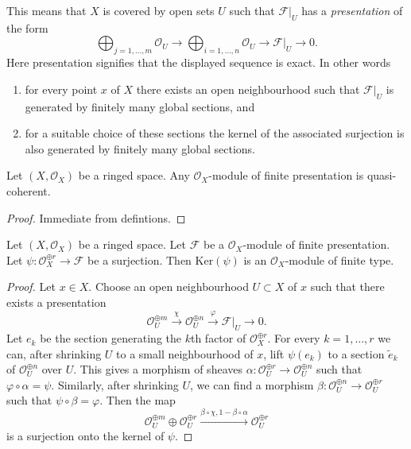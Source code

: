 \noindent
This means that $X$ is covered by open sets $U$
such that $\mathcal{F}|_U$ has a {\it presentation}
of the form
$$
\bigoplus\nolimits_{j = 1, \ldots, m}
\mathcal{O}_U
\longrightarrow
\bigoplus\nolimits_{i = 1, \ldots, n}
\mathcal{O}_U
\to
\mathcal{F}|_U
\to
0.
$$
Here presentation signifies that the displayed
sequence is exact. In other words
\begin{enumerate}
\item for every point $x$ of $X$ there exists
an open neighbourhood such that $\mathcal{F}|_U$
is generated by finitely many global sections, and
\item for a suitable choice of these sections
the kernel of the associated surjection is also
generated by finitely many global sections.
\end{enumerate}

\begin{lemma}
\label{lemma-finite-presentation-quasi-coherent}
Let $(X, \mathcal{O}_X)$ be a ringed space.
Any $\mathcal{O}_X$-module of finite presentation
is quasi-coherent.
\end{lemma}

\begin{proof}
Immediate from defintions.
\end{proof}

\begin{lemma}
\label{lemma-kernel-surjection-finite-free-onto-finite-presentation}
Let $(X, \mathcal{O}_X)$ be a ringed space.
Let $\mathcal{F}$ be a $\mathcal{O}_X$-module of finite presentation.
Let $\psi : \mathcal{O}_X^{\oplus r} \to \mathcal{F}$ be a surjection.
Then $\text{Ker}(\psi)$ is an $\mathcal{O}_X$-module of finite type.
\end{lemma}

\begin{proof}
Let $x \in X$. Choose an open neighbourhood $U \subset X$ of $x$
such that there exists a presentation
$$
\mathcal{O}_U^{\oplus m}
\xrightarrow{\chi}
\mathcal{O}_U^{\oplus n}
\xrightarrow{\varphi}
\mathcal{F}|_U
\to
0.
$$
Let $e_k$ be the section generating the $k$th factor of
$\mathcal{O}_X^{\oplus r}$. For every $k = 1, \ldots, r$
we can, after shrinking $U$ to a small neighbourhood of $x$,
lift $\psi(e_k)$ to a section $\tilde e_k$ of
$\mathcal{O}_U^{\oplus n}$ over $U$. This gives a morphism
of sheaves $\alpha : \mathcal{O}_U^{\oplus r} \to \mathcal{O}_U^{\oplus n}$
such that $\varphi \circ \alpha = \psi$.
Similarly, after shrinking $U$, we can find a morphism
$\beta : \mathcal{O}_U^{\oplus n} \to \mathcal{O}_U^{\oplus r}$
such that $\psi \circ \beta = \varphi$. Then the map
$$
\mathcal{O}_U^{\oplus m} \oplus
\mathcal{O}_U^{\oplus r}
\xrightarrow{\beta \circ \chi, 1 - \beta \circ \alpha}
\mathcal{O}_U^{\oplus r}
$$
is a surjection onto the kernel of $\psi$.
\end{proof}

